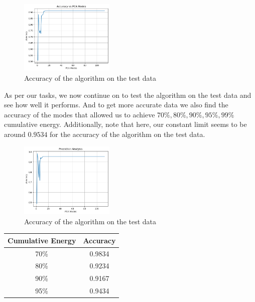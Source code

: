 \documentclass[11pt]{amsart}
\begin{document}
\begin{figure}[H]
    \centering
    \includegraphics[width=0.4\textwidth]{train_acc.png}
    \caption{Accuracy of the algorithm on the test data}
\end{figure}

As per our tasks, we now continue on to test the algorithm on the test data and see how well it performs. And to get more accurate data we also find the accuracy of the modes that allowed us to achieve $70\%, 80\%, 90\%, 95\%, 99\%$ cumulative energy. Additionally, note that here, our constant limit seems to be around $0.9534$ for the accuracy of the algorithm on the test data.

\begin{figure}[H]
    \centering
    \includegraphics[width=0.4\textwidth]{test_acc.png}
    \caption{Accuracy of the algorithm on the test data}
\end{figure}



\begin{table}[H]
    \centering
    \begin{tabular}{|c|c|}
    \hline
    \textbf{Cumulative Energy} & \textbf{Accuracy} \\ \hline
    70\%                       & 0.9834                            \\ \hline
    80\%                       & 0.9234                            \\ \hline
    90\%                       & 0.9167                            \\ \hline
    95\%                       & 0.9434                           \\ \hline
    \end{tabular}
\end{table}
\end{document}

